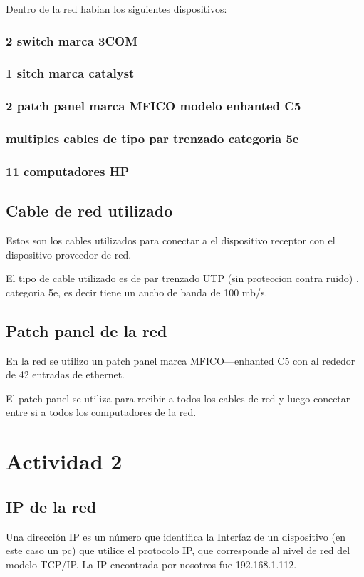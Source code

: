 \documentclass[11pt,a4paper]{report}
\begin{document}
\begin{multicols}{2}
Dentro de la red habian los siguientes dispositivos:
\subsubsection{2 switch marca 3COM}
\subsubsection{1 sitch marca catalyst}
\subsubsection{2 patch panel marca MFICO modelo enhanted C5}
\subsubsection{multiples cables de tipo par trenzado categoria 5e}
\subsubsection{11 computadores HP}

\subsection{Cable de red utilizado}
Estos son los cables utilizados para conectar a el dispositivo receptor con el dispositivo proveedor de red.

El tipo de cable utilizado es de par trenzado UTP (sin proteccion contra ruido) , categoria 5e, es decir tiene un ancho de banda de 100 mb/s.
\subsection{Patch panel de la red}
En la red se utilizo un patch panel marca MFICO---enhanted C5 con al rededor de 42 entradas de ethernet.

El patch panel se utiliza para recibir a todos los cables de red y luego conectar entre si a todos los computadores de la red.

\section{Actividad 2}
\subsection{IP de la red}
Una dirección IP es un número que identifica la Interfaz de un dispositivo (en este caso un pc) que utilice el protocolo IP, que corresponde al nivel de red del modelo TCP/IP.
La IP encontrada por nosotros fue 192.168.1.112.

\end{multicols}
\end{document}
